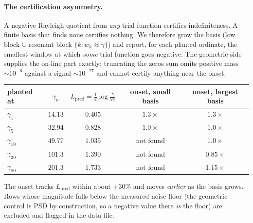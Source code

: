 \documentclass[11pt,a4paper]{article}
\theoremstyle{definition}
\theoremstyle{remark}
\begin{document}
\paragraph{The certification asymmetry.} A negative Rayleigh quotient from \emph{any} trial
function certifies indefiniteness. A finite basis that finds none certifies nothing. We
therefore grow the basis (low block $\cup$ resonant block $\{k:w_k\approx\gamma\}$) and
report, for each planted ordinate, the smallest window at which \emph{some} trial function
goes negative. The geometric side supplies the on-line part exactly; truncating the zeros
sum omits positive mass $\sim10^{-6}$ against a signal $\sim10^{-27}$ and cannot certify
anything near the onset.

\begin{center}
\begin{tabular}{@{}lcccc@{}}
\toprule
planted at & $\gamma_n$ & $L_{\mathrm{pred}}=\tfrac12\log\frac{\gamma}{2\pi}$ &
onset, small basis & onset, largest basis \\
\midrule
$\gamma_1$    & $14.13$  & $0.405$ & $1.3\times$ & $1.3\times$ \\
$\gamma_5$    & $32.94$  & $0.828$ & $1.0\times$ & $1.0\times$ \\
$\gamma_{10}$ & $49.77$  & $1.035$ & not found   & $1.0\times$ \\
$\gamma_{30}$ & $101.3$  & $1.390$ & not found   & $\mathbf{0.85\times}$ \\
$\gamma_{80}$ & $201.3$  & $1.733$ & not found   & $1.15\times$ \\
\bottomrule
\end{tabular}
\end{center}

The onset tracks $L_{\mathrm{pred}}$ within about $\pm30\%$ and moves \emph{earlier} as the
basis grows. Rows whose magnitude falls below the measured noise floor (the geometric
control is PSD by construction, so a negative value there \emph{is} the floor) are excluded
and flagged in the data file.
\end{document}
